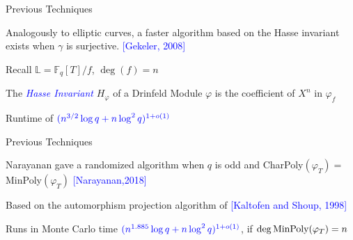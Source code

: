 \documentclass{beamer}
\newcommand{\blue}{\textcolor{blue}}
\newcommand{\spa}{\vspace{0.2cm}}
\begin{document}







\begin{frame}{Previous Techniques}


Analogously to elliptic curves, a faster algorithm based on the Hasse invariant exists when $\gamma$ is surjective. \blue{[Gekeler, 2008]}

\spa

Recall $\mathbb{L} = \mathbb{F}_q[T]/f$, $\deg(f) = n$

\begin{definition}
    \item The \blue{\textit{Hasse Invariant}} $H_{\varphi}$ of a Drinfeld Module $\varphi$ is the coefficient of $X^n$ in $\varphi_f$
\end{definition}

\spa

Runtime of $\blue{(n^{3/2} \log q + n \log^2 q)^{1+o(1)}}$








\end{frame}


\begin{frame}{Previous Techniques}

Narayanan gave a randomized algorithm when $q$ is odd and  CharPoly$(\varphi_T) = $ MinPoly$(\varphi_T)$ \blue{[Narayanan,2018]}

\spa

Based on the automorphism projection algorithm of \blue{[Kaltofen and Shoup, 1998]}

\spa


Runs in Monte Carlo time $\blue{(n^{1.885} \log q + n \log^2 q)^{1+o(1)}}$,
  if $ \deg \textnormal{MinPoly}(\varphi_T) = n$
    
\end{frame}

\end{document}
